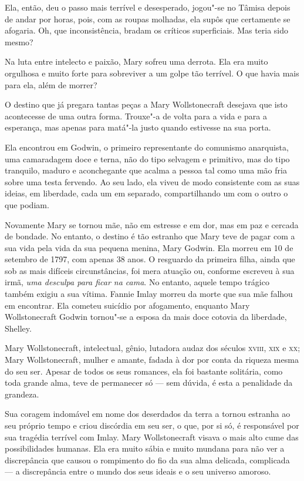 Ela, então, deu o passo mais terrível e desesperado, jogou"-se no Tâmisa
depois de andar por horas, pois, com as roupas molhadas, ela supôs que
certamente se afogaria. Oh, que inconsistência, bradam os críticos
superficiais. Mas teria sido mesmo?

Na luta entre intelecto e paixão, Mary sofreu uma derrota. Ela era muito
orgulhosa e muito forte para sobreviver a um golpe tão terrível. O que
havia mais para ela, além de morrer?

O destino que já pregara tantas peças a Mary Wollstonecraft desejava que
isto acontecesse de uma outra forma. Trouxe"-a de volta para a vida e para a
esperança, mas apenas para matá"-la justo quando estivesse na sua porta.

Ela encontrou em Godwin, o primeiro representante do comunismo
anarquista, uma camaradagem doce e terna, não do tipo selvagem e
primitivo, mas do tipo tranquilo, maduro e aconchegante que acalma a
pessoa tal como uma mão fria sobre uma testa fervendo. Ao seu lado, ela
viveu de modo consistente com as suas ideias, em liberdade, cada um em
separado, compartilhando um com o outro o que podiam.

Novamente Mary se tornou mãe, não em estresse e em dor, mas em paz e
cercada de bondade. No entanto, o destino é tão estranho que Mary teve
de pagar com a sua vida pela vida da sua pequena menina, Mary Godwin.
Ela morreu em 10 de setembro de 1797, com apenas 38 anos. O resguardo da
primeira filha, ainda que sob as mais difíceis circunstâncias, foi mera
atuação ou, conforme escreveu à sua irmã, \textit{uma desculpa para ficar na
cama}. No entanto, aquele tempo trágico também exigiu a sua vítima.
Fannie Imlay morreu da morte que sua mãe falhou em encontrar. Ela
cometeu suicídio por afogamento, enquanto Mary Wollstonecraft Godwin
tornou"-se a esposa da mais doce cotovia da liberdade, Shelley.

Mary Wollstonecraft, intelectual, gênio, lutadora audaz dos séculos
\textsc{xviii}, \textsc{xix} e \textsc{xx}; Mary Wollstonecraft, mulher e amante, fadada à dor por
conta da riqueza mesma do seu ser. Apesar de todos os seus romances, ela
foi bastante solitária, como toda grande alma, teve de permanecer só --- sem
dúvida, é esta a penalidade da grandeza.

Sua coragem indomável em nome dos deserdados da terra a tornou estranha
ao seu próprio tempo e criou discórdia em seu ser, o que, por si só, é
responsável por sua tragédia terrível com Imlay. Mary Wollstonecraft
visava o mais alto cume das possibilidades humanas. Ela era muito sábia
e muito mundana para não ver a discrepância que causou o rompimento do fio da sua alma delicada, complicada --- a discrepância entre o mundo dos seus ideais e o seu universo amoroso.

